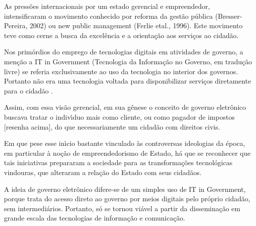 \documentclass[
12pt,		%
openright,	%
twoside,  %
a4paper,			%
chapter=TITLE,		%
english,			%
french,				%
spanish,			%
brazil				%
]{USPSC-classe/USPSC_RedarTex}
\begin{document}
As press\~oes internacionais por um estado \textquotedbl gerencial e empreendedor, intensificaram o movimento conhecido por reforma da gest\~ao p\'ublica (Bresser-Pereira, 2002) ou new public management (Ferlie etal., 1996). Este movimento teve como cerne a \textquotedbl busca da excel\^encia e a orienta\c{c}\~ao aos servi\c{c}os ao cidad\~ao.










Nos prim\'ordios do emprego de tecnologias digitais em atividades de governo, a men\c{c}\~ao a \textquotedbl IT in Government (\textquotedbl Tecnologia da Informa\c{c}\~ao no Governo, em tradu\c{c}\~ao livre) se referia exclusivamente ao uso da tecnologia no interior dos governos. Portanto n\~ao era uma tecnologia voltada para disponibilizar servi\c{c}os diretamente para o cidad\~ao .










Assim, com essa vis\~ao gerencial, em sua g\^enese o conceito de governo eletr\^onico buscava tratar o indiv\'{\i}duo mais como \textquotedbl cliente, ou como \textquotedbl pagador de impostos [resenha acima], do que necessariamente um cidad\~ao com direitos civis.










Em que pese esse in\'{\i}cio bastante vinculado \`as controversas ideologias da \'epoca, em particular \`a no\c{c}\~ao de \textquotedbl empreendedorismo de Estado, h\'a que se reconhecer que tais iniciativas prepararam a sociedade para as transforma\c{c}\~oes tecnol\'ogicas vindouras, que alteraram a rela\c{c}\~ao do Estado com seus cidad\~aos.










A ideia de governo eletr\^onico difere-se de um simples uso de \textquotedbl IT in Government, porque trata do acesso direto ao governo por meios digitais pelo pr\'oprio cidad\~ao, sem intermedi\'arios. Portanto, s\'o se tornou vi\'avel a partir da dissemina\c{c}\~ao em grande escala das tecnologias de informa\c{c}\~ao e comunica\c{c}\~ao.
\end{document}
